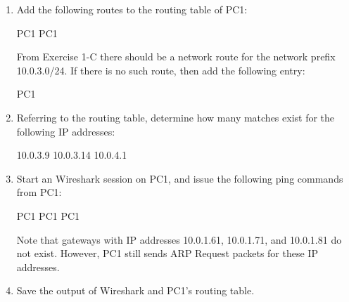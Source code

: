 \begin{enumerate}
	\item Add the following routes to the routing table of PC1:
		\begin{cmdblock}
	PC1%
	PC1%
		\end{cmdblock}
		From Exercise 1-C there should be a network route for the network prefix 10.0.3.0/24. If there is no such route, then add the following entry:
		\begin{cmdblock}
	PC1%
		\end{cmdblock}
	\item Referring to the routing table, determine how many matches exist for the following IP addresses:
		\begin{cmdblock}
	10.0.3.9 
	10.0.3.14
	10.0.4.1
		\end{cmdblock}
	\item Start an Wireshark session on PC1, and issue the following ping commands from PC1:
		\begin{cmdblock}
	PC1%
	PC1%
	PC1%
		\end{cmdblock}

		Note that gateways with IP addresses 10.0.1.61, 10.0.1.71, and 10.0.1.81 do not exist. However, PC1 still sends ARP Request packets for these IP addresses.
	\item Save the output of Wireshark and PC1's routing table.
\end{enumerate}

\begin{questions}
\end{questions}
	
